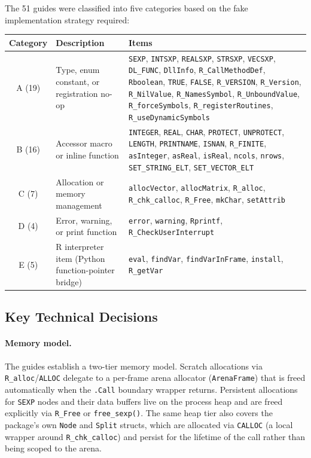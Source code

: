 \documentclass[12pt]{article}
\begin{document}
The 51 guides were classified into five categories based on the fake implementation strategy required:
\begin{center}
\begin{tabular}{clp{7.5cm}}
\toprule
Category & Description & Items \\
\midrule
A (19) & Type, enum constant, or registration no-op & \texttt{SEXP}, \texttt{INTSXP}, \texttt{REALSXP}, \texttt{STRSXP}, \texttt{VECSXP}, \texttt{DL\_FUNC}, \texttt{DllInfo}, \texttt{R\_CallMethodDef}, \texttt{Rboolean}, \texttt{TRUE}, \texttt{FALSE}, \texttt{R\_VERSION}, \texttt{R\_Version}, \texttt{R\_NilValue}, \texttt{R\_NamesSymbol}, \texttt{R\_UnboundValue}, \texttt{R\_forceSymbols}, \texttt{R\_registerRoutines}, \texttt{R\_useDynamicSymbols} \\
\midrule
B (16) & Accessor macro or inline function & \texttt{INTEGER}, \texttt{REAL}, \texttt{CHAR}, \texttt{PROTECT}, \texttt{UNPROTECT}, \texttt{LENGTH}, \texttt{PRINTNAME}, \texttt{ISNAN}, \texttt{R\_FINITE}, \texttt{asInteger}, \texttt{asReal}, \texttt{isReal}, \texttt{ncols}, \texttt{nrows}, \texttt{SET\_STRING\_ELT}, \texttt{SET\_VECTOR\_ELT} \\
\midrule
C (7) & Allocation or memory management & \texttt{allocVector}, \texttt{allocMatrix}, \texttt{R\_alloc}, \texttt{R\_chk\_calloc}, \texttt{R\_Free}, \texttt{mkChar}, \texttt{setAttrib} \\
\midrule
D (4) & Error, warning, or print function & \texttt{error}, \texttt{warning}, \texttt{Rprintf}, \texttt{R\_CheckUserInterrupt} \\
\midrule
E (5) & R interpreter item (Python function-pointer bridge) & \texttt{eval}, \texttt{findVar}, \texttt{findVarInFrame}, \texttt{install}, \texttt{R\_getVar} \\
\bottomrule
\end{tabular}
\end{center}

\subsection{Key Technical Decisions}

\paragraph{Memory model.} The guides establish a two-tier memory model. Scratch allocations via \texttt{R\_alloc}/\texttt{ALLOC} delegate to a per-frame arena allocator (\texttt{ArenaFrame}) that is freed automatically when the \texttt{.Call} boundary wrapper returns. Persistent allocations for \texttt{SEXP} nodes and their data buffers live on the process heap and are freed explicitly via \texttt{R\_Free} or \texttt{free\_sexp()}. The same heap tier also covers the package's own \texttt{Node} and \texttt{Split} structs, which are allocated via \texttt{CALLOC} (a local wrapper around \texttt{R\_chk\_calloc}) and persist for the lifetime of the call rather than being scoped to the arena.
\end{document}
